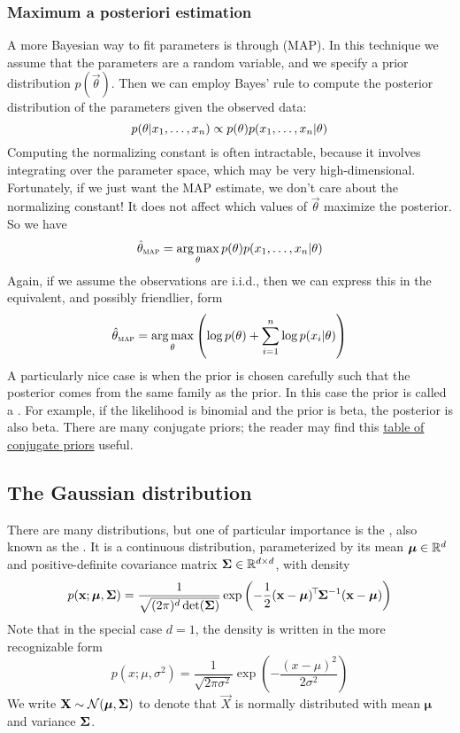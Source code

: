 \subsubsection{Maximum a posteriori estimation}
A more Bayesian way to fit parameters is through  (MAP).
In this technique we assume that the parameters are a random variable, and we specify a prior distribution $p(\vec{\theta})$.
Then we can employ Bayes' rule to compute the posterior distribution of the parameters given the observed data:
\[p(\mathbf{\theta} | x_1, \dots, x_n) \propto p(\mathbf{\theta})p(x_1, \dots, x_n | \mathbf{\theta})\]
Computing the normalizing constant is often intractable, because it involves integrating over the parameter space, which may be very high-dimensional.
Fortunately, if we just want the MAP estimate, we don't care about the normalizing constant!
It does not affect which values of $\vec{\theta}$ maximize the posterior.
So we have
\[\hat{\mathbf{\theta}}_\textsc{map} = \operatorname*{arg\,max}_{\mathbf{\theta}} p(\mathbf{\theta})p(x_1, \dots, x_n | \mathbf{\theta})\]
Again, if we assume the observations are i.i.d., then we can express this in the equivalent, and possibly friendlier, form
\[\hat{\mathbf{\theta}}_\textsc{map} = \operatorname*{arg\,max}_{\mathbf{\theta}} \left(\log p(\mathbf{\theta}) + \sum_{i=1}^n \log p(x_i | \mathbf{\theta})\right)\]
A particularly nice case is when the prior is chosen carefully such that the posterior comes from the same family as the prior.
In this case the prior is called a .
For example, if the likelihood is binomial and the prior is beta, the posterior is also beta.
There are many conjugate priors; the reader may find this \href{https://en.wikipedia.org/wiki/Conjugate_prior#Table_of_conjugate_distributions}{table of conjugate priors} useful.

\subsection{The Gaussian distribution}
There are many distributions, but one of particular importance is the , also known as the .
It is a continuous distribution, parameterized by its mean $\bm\mu \in \mathbb{R}^d$ and positive-definite covariance matrix $\mathbf{\Sigma} \in \mathbb{R}^{d \times d}$, with density
\[p(\mathbf{x}; \bm\mu, \mathbf{\Sigma}) = \frac{1}{\sqrt{(2\pi)^d \det(\mathbf{\Sigma})}}\exp\left(-\frac{1}{2}(\mathbf{x} - \bm\mu)^{\!\top\!}\mathbf{\Sigma}^{-1}(\mathbf{x} - \bm\mu)\right)\]
Note that in the special case $d = 1$, the density is written in the more recognizable form
\[p(x; \mu, \sigma^2) = \frac{1}{\sqrt{2\pi\sigma^2}}\exp\left(-\frac{(x-\mu)^2}{2\sigma^2}\right)\]
We write $\mathbf{X} \sim \mathcal{N}(\bm\mu, \mathbf{\Sigma})$ to denote that $\vec{X}$ is normally distributed with mean $\bm\mu$ and variance $\mathbf{\Sigma}$.

